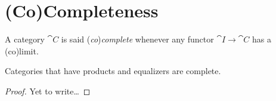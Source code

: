 
\section{(Co)Completeness}

\begin{definition}
A category \(\cat C\) is said ({\em co}){\em complete} whenever any functor \(\cat I \to \cat C\) has a (co)limit.
\end{definition}

\begin{proposition}\label{proposition:Completeness}
Categories that have products and equalizers are complete. 
\end{proposition}

\begin{proof}
Yet to write\dots{}
\end{proof}

